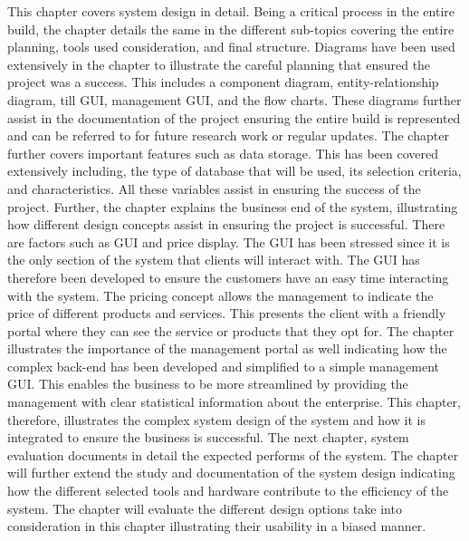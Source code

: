 This chapter covers system design in detail. Being a critical process in the entire build, the chapter details the same in the different sub-topics covering the entire planning, tools used consideration, and final structure. Diagrams have been used extensively in the chapter to illustrate the careful planning that ensured the project was a success. This includes a component diagram, entity-relationship diagram, till GUI, management GUI, and the flow charts. These diagrams further assist in the documentation of the project ensuring the entire build is represented and can be referred to for future research work or regular updates. 
\newline
\newline
The chapter further covers important features such as data storage. This has been covered extensively including, the type of database that will be used, its selection criteria, and characteristics. All these variables assist in ensuring the success of the project. Further, the chapter explains the business end of the system, illustrating how different design concepts assist in ensuring the project is successful. 
There are factors such as GUI and price display. The GUI has been stressed since it is the only section of the system that clients will interact with. The GUI has therefore been developed to ensure the customers have an easy time interacting with the system. The pricing concept allows the management to indicate the price of different products and services. This presents the client with a friendly portal where they can see the service or products that they opt for.
\newline
\newline
The chapter illustrates the importance of the management portal as well indicating how the complex back-end has been developed and simplified to a simple management GUI. This enables the business to be more streamlined by providing the management with clear statistical information about the enterprise. This chapter, therefore, illustrates the complex system design of the system and how it is integrated to ensure the business is successful. The next chapter, system evaluation documents in detail the expected performs of the system. The chapter will further extend the study and documentation of the system design indicating how the different selected tools and hardware contribute to the efficiency of the system. The chapter will evaluate the different design options take into consideration in this chapter illustrating their usability in a biased manner.

